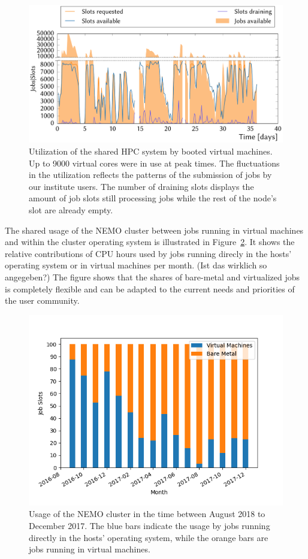 \begin{figure}
\begin{center}
  \includegraphics[width=0.9\linewidth]{figures/NEMO_KIT_utiliztion.pdf}
  \caption{Utilization of the shared HPC system by booted virtual machines. Up to 9000 virtual cores were in use at peak times. The fluctuations in the utilization reflects the patterns of the submission of jobs by our institute users. The number of draining slots displays the amount of job slots still processing jobs while the rest of the node's slot are already empty.}
  \label{fig-frplots}
\end{center}
\end{figure}

The shared usage of the NEMO cluster between jobs running in virtual
machines and within the cluster operating system is illustrated in
Figure~\ref{fig-nodeusage}. It shows the relative contributions of CPU hours used by jobs running
direcly in the hosts' operating system or in virtual machines per month.
(Ist das wirklich so angegeben?)
The figure shows that the shares of bare-metal and virtualized jobs is
completely flexible and can be adapted to the current needs and
priorities of the user community.


\begin{figure}
\begin{center}
  \includegraphics[width=0.9\linewidth]{figures/NodeUsage_2016-08_2017-12.png}
  \caption{Usage of the NEMO cluster in the time between August 2018
    to December 2017. The blue bars indicate the usage by jobs
    running directly in the hosts' operating system, while the orange bars are jobs
    running in virtual machines.}
  \label{fig-nodeusage}
\end{center}
\end{figure}

